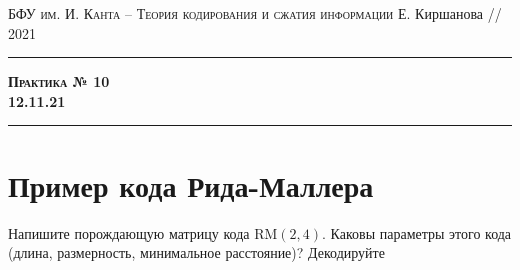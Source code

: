 \documentclass[11pt]{exam}
\theoremstyle{definition}
\begin{document}
	{\noindent
		\textsc{БФУ им. И. Канта -- Теория кодирования и сжатия информации}
		\hfill {Е. Киршанова // 2021\\}
	\hrule
	\begin{center}
		{\Large\textbf{
				\textsc{Практика № 10} \\[5pt] {12.11.21}
		} } 
	\end{center}
	\hrule \vspace{5mm}
	
	\thispagestyle{empty}
	
	\vspace{0.2cm}
	

	
%
		
	
%			
% 		
 		
 
\section{Пример кода Рида-Маллера}

\begin{questions}
	\question Напишите порождающую матрицу кода  $\mathrm{RM}(2,4)$. Каковы параметры этого кода (длина, размерность, минимальное расстояние)?
	\question Декодируйте
	

\end{questions}}
\end{document}
